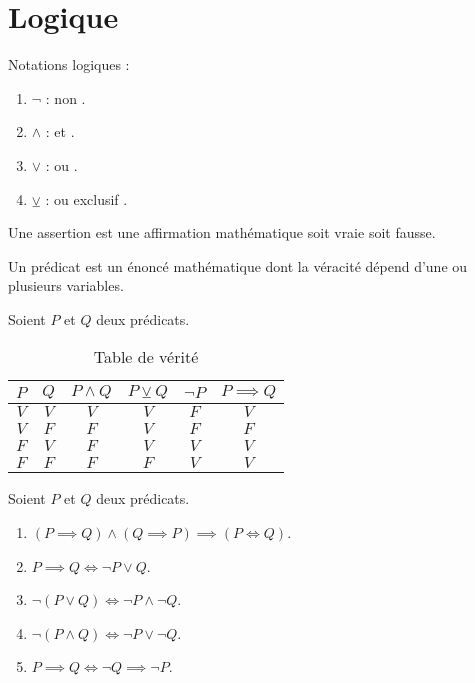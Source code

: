 \chapter{Logique}
\noindent Notations logiques :
\begin{enumerate}
	\item $\neg$ : \og non \fg.
	\item $\land$ : \og et \fg.
	\item $\lor$ : \og ou \fg.
	\item $\veebar$ : \og ou exclusif \fg.
\end{enumerate}

\begin{definition}[Assertion]
  Une assertion est une affirmation mathématique soit vraie soit fausse.
\end{definition}

\begin{definition}[Prédicat]
  Un prédicat est un énoncé mathématique dont la véracité dépend d'une ou plusieurs variables.
\end{definition}

Soient $P$ et $Q$ deux prédicats.
\begin{table}[!h]
	\centering
	\begin{tabular}{cccccc}
		\toprule
		$P$ & $Q$ & $P \land Q$ & $P \veebar Q$ & $\neg P$ & $P \implies Q$ \\
		\midrule
		$V$ & $V$ & $V$ & $V$ & $F$ & $V$ \\
		$V$ & $F$ & $F$ & $V$ & $F$ & $F$ \\
		$F$ & $V$ & $F$ & $V$ & $V$ & $V$ \\
		$F$ & $F$ & $F$ & $F$ & $V$ & $V$ \\
		\bottomrule
	\end{tabular}
	\caption{Table de vérité}
\end{table}

\begin{proposition}
  Soient $P$ et $Q$ deux prédicats.  
	\begin{enumerate} 
		\item $(P \implies Q) \land (Q \implies P) \implies (P \iff Q)$.
		\item $P \implies Q \iff \neg P \lor Q$.
		\item $\neg (P \lor Q) \iff \neg P \land \neg Q$.
		\item $\neg (P \land Q) \iff \neg P \lor \neg Q$.
		\item $P \implies Q \iff \neg Q \implies \neg P$.
	\end{enumerate}
\end{proposition}

